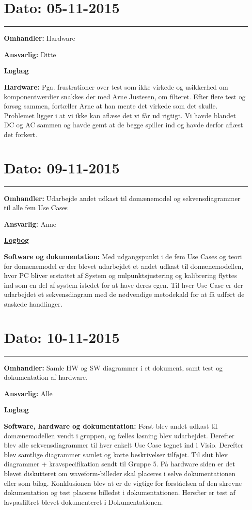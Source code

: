 \section{Dato: 05-11-2015}
\hrule
\textbf{Omhandler:} Hardware

\textbf{Ansvarlig:} Ditte

\underline{\textbf{Logbog}}

\textbf{Hardware: } Pga. frustrationer over test som ikke virkede og usikkerhed om komponentværdier snakkes der med Arne Justesen, om filteret. Efter flere test og forsøg sammen, fortæller Arne at han mente det virkede som det skulle. Problemet ligger i at vi ikke kan aflæse det vi får ud rigtigt. Vi havde blandet DC og AC sammen og havde gemt at de begge spiller ind og havde derfor aflæst det forkert.  
\\

\section{Dato: 09-11-2015}
\hrule
\textbf{Omhandler:} Udarbejde andet udkast til domænemodel og sekvensdiagrammer til alle fem Use Cases

\textbf{Ansvarlig:} Anne

\underline{\textbf{Logbog}}

\textbf{Software og dokumentation: }Med udgangspunkt i de fem Use Cases og teori for domænemodel er der blevet udarbejdet et andet udkast til domænemodellen, hvor PC bliver erstattet af System og nulpunktsjustering og kalibrering flyttes ind som en del af system istedet for at have deres egen.
Til hver Use Case er der udarbejdet et sekvensdiagram med de nødvendige metodekald for at få udført de ønskede handlinger.
\\

\section{Dato: 10-11-2015}
\hrule
\textbf{Omhandler:} Samle HW og SW diagrammer i et dokument, samt test og dokumentation af hardware.

\textbf{Ansvarlig:} Alle

\underline{\textbf{Logbog}}

\textbf{Software, hardware og dokumentation: }Først blev andet udkast til domænemodellen vendt i gruppen, og fælles løsning blev udarbejdet. Derefter blev alle sekvensdiagrammer til hver enkelt Use Case tegnet ind i Visio. Derefter blev samtlige diagrammer samlet og korte beskrivelser tilføjet. Til slut blev diagrammer + kravspecifikation sendt til Gruppe 5. 
På hardware siden er det blevet diskutteret om waveform-billeder skal placeres i selve dokumentationen eller som bilag. Konklusionen blev at er de vigtige for forståelsen af den skrevne dokumentation og test placeres billedet i dokumentationen. Herefter er test af lavpasfiltret blevet dokumenteret i Dokumentationen.

